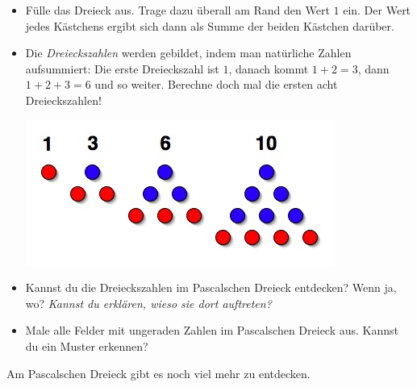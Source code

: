 \documentclass[a4paper,ngerman]{scrartcl}
\begin{document}
\renewcommand{\labelitemi}{$\triangle$}

\Large
\begin{itemize}
\item Fülle das Dreieck aus. Trage dazu überall am Rand den Wert $1$ ein. Der
Wert jedes Kästchens ergibt sich dann als Summe der beiden Kästchen darüber.
\item Die \emph{Dreieckszahlen} werden gebildet, indem man natürliche Zahlen
aufsummiert: Die erste Dreieckszahl ist $1$, danach kommt $1+2 = 3$, dann
$1+2+3 = 6$ und so weiter. Berechne doch mal die ersten acht Dreieckszahlen!
\begin{center}
\includegraphics[scale=0.5]{triangular-numbers}
\end{center}
\item Kannst du die Dreieckszahlen im Pascalschen Dreieck entdecken? Wenn ja, wo?
\emph{Kannst du erklären, wieso sie dort auftreten?}
\item Male alle Felder mit ungeraden Zahlen im Pascalschen Dreieck aus. Kannst
du ein Muster erkennen?          
\end{itemize}


\newpage

Am Pascalschen Dreieck gibt es noch viel mehr zu entdecken.
\end{document}
